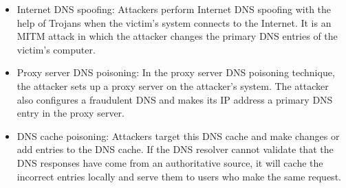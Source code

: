 \begin{itemize}
\begin{itemize}
        \item Internet DNS spoofing: Attackers perform Internet DNS spoofing with the help of Trojans when the victim's system connects to the Internet. It is an MITM attack in which the attacker changes the primary DNS entries of the victim's computer.
        \item Proxy server DNS poisoning: In the proxy server DNS poisoning technique, the attacker sets up a proxy server on the attacker's system. The attacker also configures a fraudulent DNS and makes its IP address a primary DNS entry in the proxy server.
        \item DNS cache poisoning: Attackers target this DNS cache and make changes or add entries to the DNS cache. If the DNS resolver cannot validate that the DNS responses have come from an authoritative source, it will cache the incorrect entries locally and serve them to users who make the same request.
    \end{itemize}
\end{itemize}
